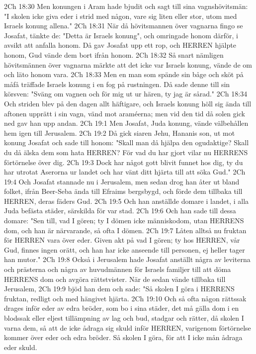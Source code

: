 2Ch 18:30  Men konungen i Aram hade bjudit och sagt till sina vagnshövitsmän: "I skolen icke giva eder i strid med någon, vare sig liten eller stor, utom med Israels konung allena."
2Ch 18:31  När då hövitsmannen över vagnarna fingo se Josafat, tänkte de: "Detta är Israels konung", och omringade honom därför, i avsikt att anfalla honom. Då gav Josafat upp ett rop, och HERREN hjälpte honom, Gud vände dem bort ifrån honom.
2Ch 18:32  Så snart nämligen hövitsmännen över vagnarna märkte att det icke var Israels konung, vände de om och läto honom vara.
2Ch 18:33  Men en man som spände sin båge och sköt på måfå träffade Israels konung i en fog på rustningen. Då sade denne till sin körsven: "Sväng om vagnen och för mig ut ur hären, ty jag är sårad."
2Ch 18:34  Och striden blev på den dagen allt häftigare, och Israels konung höll sig ända till aftonen upprätt i sin vagn, vänd mot araméerna; men vid den tid då solen gick ned gav han upp andan.
2Ch 19:1  Men Josafat, Juda konung, vände välbehållen hem igen till Jerusalem.
2Ch 19:2  Då gick siaren Jehu, Hananis son, ut mot konung Josafat och sade till honom: "Skall man då hjälpa den ogudaktige? Skall du då älska dem som hata HERREN? För vad du har gjort vilar nu HERRENS förtörnelse över dig.
2Ch 19:3  Dock har något gott blivit funnet hos dig, ty du har utrotat Aserorna ur landet och har vänt ditt hjärta till att söka Gud."
2Ch 19:4  Och Josafat stannade nu i Jerusalem, men sedan drog han åter ut bland folket, ifrån Beer-Seba ända till Efraims bergsbygd, och förde dem tillbaka till HERREN, deras fäders Gud.
2Ch 19:5  Och han anställde domare i landet, i alla Juda befästa städer, särskilda för var stad.
2Ch 19:6  Och han sade till dessa domare: "Sen till, vad I gören; ty I dömen icke människodom, utan HERRENS dom, och han är närvarande, så ofta I dömen.
2Ch 19:7  Låten alltså nu fruktan för HERREN vara över eder. Given akt på vad I gören; ty hos HERREN, vår Gud, finnes ingen orätt, och han har icke anseende till personen, ej heller tager han mutor."
2Ch 19:8  Också i Jerusalem hade Josafat anställt några av leviterna och prästerna och några av huvudmännen för Israels familjer till att döma HERRENS dom och avgöra rättstvister. När de sedan vände tillbaka till Jerusalem,
2Ch 19:9  bjöd han dem och sade: "Så skolen I göra i HERRENS fruktan, redligt och med hängivet hjärta.
2Ch 19:10  Och så ofta någon rättssak drages inför eder av edra bröder, som bo i sina städer, det må gälla dom i en blodssak eller eljest tillämpning av lag och bud, stadgar och rätter, då skolen I varna dem, så att de icke ådraga sig skuld inför HERREN, varigenom förtörnelse kommer över eder och edra bröder. Så skolen I göra, för att I icke mån ådraga eder skuld.
